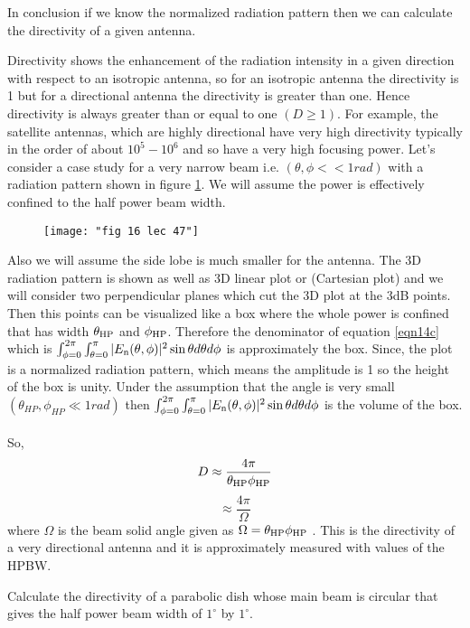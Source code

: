 \begin{enumerate}
	In conclusion if we know the normalized radiation pattern then we can calculate the directivity of a given antenna.
			
	Directivity shows the enhancement of the radiation intensity in a given direction with respect to an isotropic antenna, so for an isotropic antenna the directivity is 1 but for a directional antenna the directivity is greater than one. Hence directivity is always greater than or equal to one $(D\geq 1)$.
	For example, the satellite antennas, which are highly directional have very high directivity typically in the order of about $10^{5}-10^{6}$ and so have a very high focusing power.	Let's consider a case study for a very narrow beam i.e. $(\theta, \phi << 1rad)$ with a radiation pattern shown in figure \ref{figure16}. We will assume the power is effectively confined to the half power beam width.  
	
	\begin{figure}[h]
		\centering
		\texttt{[image: "fig 16 lec 47"]}
		\label{figure16}
	\end{figure}
	
	Also we will assume the side lobe is much smaller for the antenna. The 3D radiation pattern is shown as well as 3D linear plot or (Cartesian plot) and we will consider two perpendicular planes which cut the 3D plot at the 3dB points. Then this points can be visualized like a box where the whole power is confined that has width $\theta_\textnormal{HP}$ and $\phi_\textnormal{HP}$. Therefore the denominator of equation \ref{eqn14c} which is $\int_{\phi=0}^{2\pi} \int_{\theta=0}^{\pi}|E_\textnormal{n}(\theta, \phi)|^{2}\sin\theta d\theta d\phi$ is approximately the box.
	Since, the plot is a normalized radiation pattern, which means the amplitude is 1 so the height of the box is unity. Under the assumption that the angle is very small $(\theta_{HP}, \phi_{HP} \ll 1rad)$ then $\int_{\phi=0}^{2\pi} \int_{\theta=0}^{\pi}|E_\textnormal{n}(\theta, \phi)|^{2}\sin\theta d\theta d\phi$ is the volume of the box.\\\\ So, $$D \approx \dfrac{4\pi}{\theta_\textnormal{HP}\phi_\textnormal{HP}}$$
	$$\approx \frac{4\pi}{\Omega}$$
	where $\Omega$ is the beam solid angle given as $\Omega =\theta_\textnormal{HP}\phi_\textnormal{HP} $ .
	This is the directivity of a very directional antenna and it is approximately measured with values of the HPBW.	
\end{enumerate}	

\begin{exmp}
	 Calculate the directivity of a parabolic dish whose main beam is circular that gives the half power beam width of $1^\circ$ by $1^\circ$.
\end{exmp}

